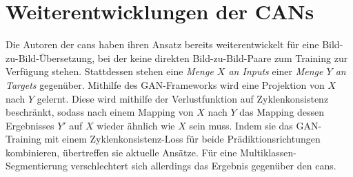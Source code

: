\section{Weiterentwicklungen der CANs}

Die Autoren der \glspl{can} haben ihren Ansatz bereits weiterentwickelt für eine Bild-zu-Bild-Übersetzung, bei der keine direkten Bild-zu-Bild-Paare zum Training zur Verfügung stehen.
Stattdessen stehen eine \emph{Menge $ X $ an Inputs} einer \emph{Menge $ Y $ an Targets} gegenüber.
Mithilfe des GAN-Frameworks wird eine Projektion von $ X $ nach $ Y $ gelernt.
Diese wird mithilfe der Verlustfunktion auf Zyklenkonsistenz beschränkt, sodass nach einem Mapping von $ X $ nach $ Y $ das Mapping dessen Ergebnisses $ Y' $ auf $ X $ wieder ähnlich wie $ X $ sein muss.
Indem sie das GAN-Training mit einem Zyklenkonsistenz-Loss für beide Prädiktionsrichtungen kombinieren, übertreffen sie aktuelle Ansätze.
Für eine Multiklassen-Segmentierung verschlechtert sich allerdings das Ergebnis gegenüber den \glspl{can}.
